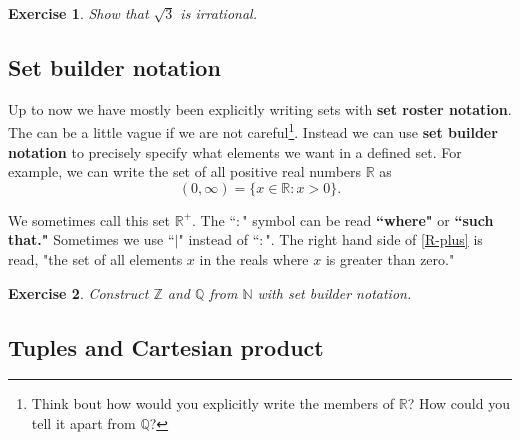 \documentclass{article}[12pt]
\newtheorem{exercise}{Exercise}
\newcommand{\N}{\mathbb{N}}
\newcommand{\Z}{\mathbb{Z}}
\newcommand{\Q}{\mathbb{Q}}
\newcommand{\R}{\mathbb{R}}
\begin{document}
            \begin{exercise}
                Show that $\sqrt{3}$ is irrational.
            \end{exercise}
            
        \subsection{Set builder notation}
            
            Up to now we have mostly been explicitly writing sets with \textbf{set roster notation}. The can be a little vague if we are not careful\footnote{Think bout how would you explicitly write the members of $\R$? How could you tell it apart from $\Q$?}. Instead we can use \textbf{set builder notation} to precisely specify what elements we want in a defined set. For example, we can write the set of all positive real numbers $\R$ as
            \begin{equation}
                (0, \infty) = \{x \in \R : x > 0\}. \label{R-plus}
            \end{equation}
            
            We sometimes call this set $\R^+$. The ``$:$" symbol can be read \textbf{``where"} or \textbf{``such that."} Sometimes we use ``$|$" instead of ``$:$". The right hand side of \eqref{R-plus} is read, "the set of all elements $x$ in the reals where $x$ is greater than zero."
            
            \begin{exercise}
                Construct $\Z$ and $\Q$ from $\N$ with set builder notation.
            \end{exercise}
        
        \subsection{Tuples and Cartesian product}
        
\end{document}
